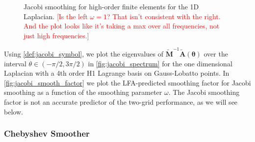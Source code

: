\documentclass[review]{siamart190516}
\newcommand{\todo}[1]{\textcolor{red}{[#1]}}
\begin{document}
\begin{figure}[!tbp]
  \centering
  \hfill
  \caption{Jacobi smoothing for high-order finite elements for the 1D Laplacian. \todo{Is the left $\omega=1$? That isn't consistent with the right. And the plot looks like it's taking a max over all frequencies, not just high frequencies.}}
\end{figure}

Using \cref{def:jacobi_symbol}, we plot the eigenvalues of $\tilde{\mathbf{M}}^{-1} \tilde{\mathbf{A}} \left( \boldsymbol{\theta} \right)$ over the interval $\theta \in \left( - \pi / 2, 3 \pi / 2 \right)$ in \cref{fig:jacobi_spectrum} for the one dimensional Laplacian with a 4th order H1 Lagrange basis on Gauss-Lobatto points.
In \cref{fig:jacobi_smooth_factor} we plot the LFA-predicted smoothing factor for Jacobi smoothing as a function of the smoothing parameter $\omega$.
The Jacobi smoothing factor is not an accurate predictor of the two-grid performance, as we will see below.

\subsubsection{Chebyshev Smoother}\label{sec:chebyshev}
\end{document}
